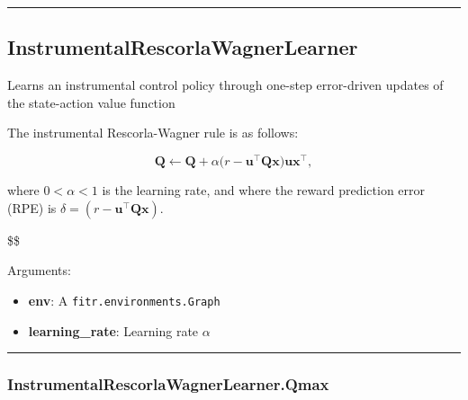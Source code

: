 \begin{center}\rule{0.5\linewidth}{\linethickness}\end{center}

\subsection{InstrumentalRescorlaWagnerLearner}\label{instrumentalrescorlawagnerlearner}

\begin{Shaded}
\begin{Highlighting}[]
\end{Highlighting}
\end{Shaded}

Learns an instrumental control policy through one-step error-driven
updates of the state-action value function

The instrumental Rescorla-Wagner rule is as follows:

\[
\mathbf Q \gets \mathbf Q + \alpha \big(r - \mathbf u^\top \mathbf Q \mathbf x \big) \mathbf u \mathbf x^\top,
\]

where \(0 < \alpha < 1\) is the learning rate, and where the reward
prediction error (RPE) is
\(\delta = (r - \mathbf u^\top \mathbf Q \mathbf x)\).

\$\$

Arguments:

\begin{itemize}
\tightlist
\item
  \textbf{env}: A \texttt{fitr.environments.Graph}
\item
  \textbf{learning\_rate}: Learning rate \(\alpha\)
\end{itemize}

\begin{center}\rule{0.5\linewidth}{\linethickness}\end{center}

\subsubsection{InstrumentalRescorlaWagnerLearner.Qmax}\label{instrumentalrescorlawagnerlearner.qmax}

\begin{Shaded}
\begin{Highlighting}[]
\end{Highlighting}
\end{Shaded}

